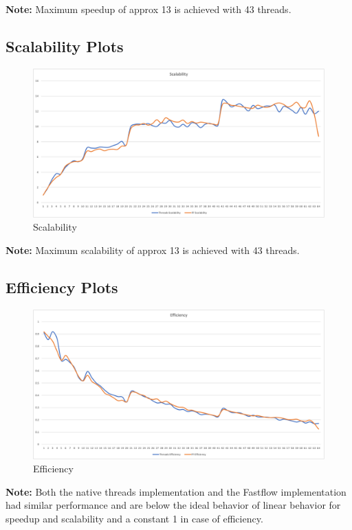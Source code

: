 \documentclass[12pt, letterpaper]{article}  %
\begin{document}
\textbf{Note:} Maximum speedup of approx 13 is achieved with 43 threads.

\subsection{Scalability Plots}
\begin{figure}[H]
\centering
    \includegraphics[width=1 \textwidth]{Images/scalability.png}
    \caption{Scalability}
\end{figure}

\textbf{Note:} Maximum scalability of approx 13 is achieved with 43 threads.

\subsection{Efficiency Plots}
\begin{figure}[H]
\centering
    \includegraphics[width=1 \textwidth]{Images/efficiency.png}
    \caption{Efficiency}
\end{figure}

\textbf{Note:} Both the native threads implementation and the Fastflow implementation had similar performance and are below the ideal behavior of linear behavior for speedup and scalability and a constant 1 in case of efficiency.
\end{document}
